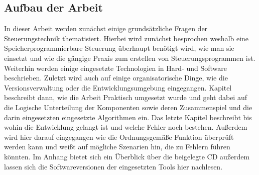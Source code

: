 \subsection{Aufbau der Arbeit}
In dieser Arbeit werden zunächst einige grundsätzliche Fragen der Steuerungstechnik thematisiert. Hierbei wird zunächst besprochen weshalb eine Speicherprogrammierbare Steuerung überhaupt benötigt wird, wie man sie einsetzt und wie die gängige Praxis zum erstellen von Steuerungsprogrammen ist. Weiterhin werden einige eingesetzte Technologien in Hard- und Software beschrieben. Zuletzt wird auch auf einige organisatorische Dinge, wie die Versionsverwaltung oder die Entwicklungsumgebung eingegangen. Kapitel  beschreibt dann, wie die Arbeit Praktisch umgesetzt wurde und geht dabei auf die Logische Unterteilung der Komponenten sowie deren Zusammenspiel und die darin eingesetzten eingesetzte Algorithmen ein. Das letzte Kapitel beschreibt bis wohin die Entwicklung gelangt ist und welche Fehler noch bestehen. Außerdem wird hier darauf eingegangen wie die Ordnungsgemäße Funktion überprüft werden kann und weißt auf mögliche Szenarien hin, die zu Fehlern führen könnten. Im Anhang bietet sich ein Überblick über die beigelegte CD außerdem lassen sich die Softwareversionen der eingesetzten Tools hier nachlesen.

\clearpage
